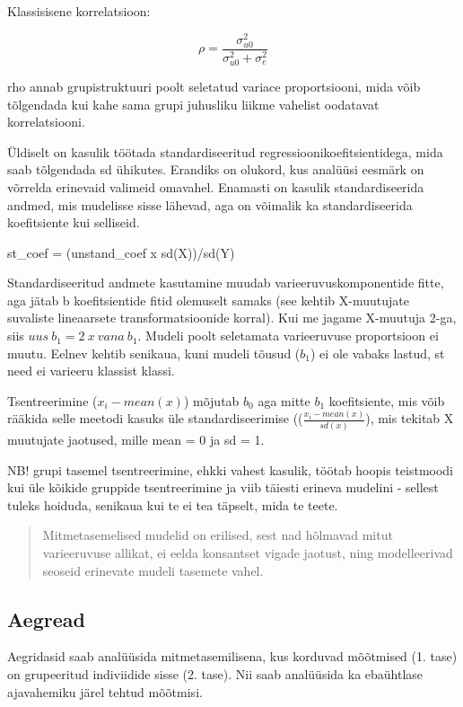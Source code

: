 \documentclass[]{book}
\begin{document}
Klassisisene korrelatsioon:

\[\rho = \frac{\sigma^2_{u0}}{\sigma^2_{u0} + \sigma^2_e}\]

rho annab grupistruktuuri poolt seletatud variace proportsiooni, mida võib tõlgendada kui kahe sama grupi juhusliku liikme vahelist oodatavat korrelatsiooni.

Üldiselt on kasulik töötada standardiseeritud regressioonikoefitsientidega, mida saab tõlgendada sd ühikutes. Erandiks on olukord, kus analüüsi eesmärk on võrrelda erinevaid valimeid omavahel. Enamasti on kasulik standardiseerida andmed, mis mudelisse sisse lähevad, aga on võimalik ka standardiseerida koefitsiente kui selliseid.

st\_coef = (unstand\_coef x sd(X))/sd(Y)

Standardiseeritud andmete kasutamine muudab varieeruvuskomponentide fitte, aga jätab b koefitsientide fitid olemuselt samaks (see kehtib X-muutujate suvaliste lineaarsete transformatsioonide korral). Kui me jagame X-muutuja 2-ga, siis \(uus ~b_1 = 2 ~x~vana~ b_1\). Mudeli poolt seletamata varieeruvuse proportsioon ei muutu. Eelnev kehtib senikaua, kuni mudeli tõusud (\(b_1\)) ei ole vabaks lastud, st need ei varieeru klassist klassi.

Tsentreerimine (\(x_i - mean(x)\)) mõjutab \(b_0\) aga mitte \(b_1\) koefitsiente, mis võib rääkida selle meetodi kasuks üle standardiseerimise ((\(\frac {x_i - mean(x)}{sd(x)}\)), mis tekitab X muutujate jaotused, mille mean = 0 ja sd = 1.

NB! grupi tasemel tsentreerimine, ehkki vahest kasulik, töötab hoopis teistmoodi kui üle kõikide gruppide tsentreerimine ja viib täiesti erineva mudelini - sellest tuleks hoiduda, senikaua kui te ei tea täpselt, mida te teete.

\begin{quote}
Mitmetasemelised mudelid on erilised, sest nad hõlmavad mitut varieeruvuse allikat, ei eelda konsantset vigade jaotust, ning modelleerivad seoseid erinevate mudeli tasemete vahel.
\end{quote}

\hypertarget{aegread}{%
\subsection{Aegread}\label{aegread}}

Aegridasid saab analüüsida mitmetasemilisena, kus korduvad mõõtmised (1. tase) on grupeeritud indiviidide sisse (2. tase). Nii saab analüüsida ka ebaühtlase ajavahemiku järel tehtud mõõtmisi.
\end{document}
